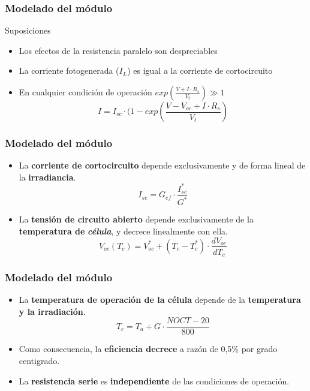 \documentclass[xcolor=dvipsnames]{beamer}
\begin{document}
\begin{frame}
  \frametitle{Modelado del módulo}
  \begin{block}{Suposiciones}

    \begin{itemize}
    \item Los efectos de la resistencia paralelo son despreciables
    \item La corriente fotogenerada ($I_{L}$) es igual a la corriente
      de cortocircuito
    \item En cualquier condición de operación $exp(\frac{V+I\cdot
        R_{s}}{V_{t}})\gg1$\[
      I=I_{sc}\cdot(1-exp(\frac{V-V_{oc}+I\cdot R_{s}}{V_{t}})\]
    \end{itemize}

  \end{block}

\end{frame}

\begin{frame}
  \frametitle{Modelado del módulo}
  \begin{itemize}
  \item La \textbf{corriente de cortocircuito} depende exclusivamente
    y de forma lineal de la \textbf{irradiancia}.\[
    I_{sc}=G_{ef}\cdot\frac{I_{sc}^{*}}{G^{*}}\]

  \item La\textbf{ tensión de circuito abierto} depende exclusivamente
    de la \textbf{temperatura de }\textbf{\emph{célula}}, y decrece
    linealmente con ella.\[
    V_{oc}(T_{c})=V_{oc}^{*}+(T_{c}-T_{c}^{*})\cdot\frac{dV_{oc}}{dT_{c}}\]

  \end{itemize}

\end{frame}

\begin{frame}
  \frametitle{Modelado del módulo}
  \begin{itemize}
  \item La \textbf{temperatura de operación de la célula} depende de
    la \textbf{temperatura y la irradiación}.\[
    T_{c}=T_{a}+G\cdot\frac{NOCT-20}{800}\]

  \item Como consecuencia, la \textbf{eficiencia decrece} a razón de
    0,5\% por grado centigrado.
  \item La\textbf{ resistencia serie} es \textbf{independiente} de las
    condiciones de operación.
  \end{itemize}

\end{frame}
\end{document}
